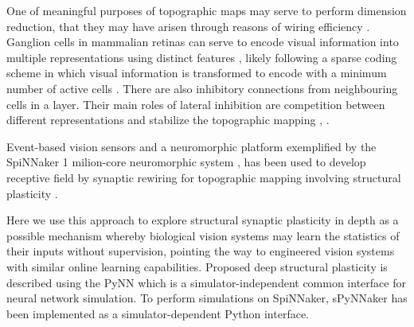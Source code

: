 \documentclass[letterpaper, 10 pt, conference]{ieeeconf}  %
\begin{document}
One of meaningful purposes of topographic maps may serve to perform dimension reduction, that they may have arisen through reasons of wiring efficiency \cite{bamford2010synaptic}.
Ganglion cells in mammalian retinas can serve to encode visual information into multiple representations using distinct features \cite{roska2014retina}, likely following a sparse coding scheme in which visual information is transformed to encode with a minimum number of active cells \cite{Field1994}.
There are also inhibitory connections from neighbouring cells in a layer. Their main roles of lateral inhibition are competition between different representations and stabilize the topographic mapping \cite{Kisvarday1994}, \cite{mauss2015neural}.

Event-based vision sensors \cite{gray1989oscillatory} and a neuromorphic platform exemplified by the SpiNNaker 1 milion-core neuromorphic system \cite{bogdan2018structural}, \cite{Furber2020} has been used to develop receptive field by synaptic rewiring for topographic mapping involving structural plasticity \cite{hopkins2018spiking}.

Here we use this approach to explore structural synaptic plasticity in depth as a possible mechanism whereby biological vision systems may learn the statistics of their inputs without supervision, pointing the way to engineered vision systems with similar online learning capabilities.
Proposed deep structural plasticity is described using the PyNN \cite{davison2009pynn} which is a simulator-independent common interface for neural network simulation. To perform simulations on SpiNNaker,  sPyNNaker \cite{rhodes2018spynnaker} has been implemented as a simulator-dependent Python interface.

\end{document}
